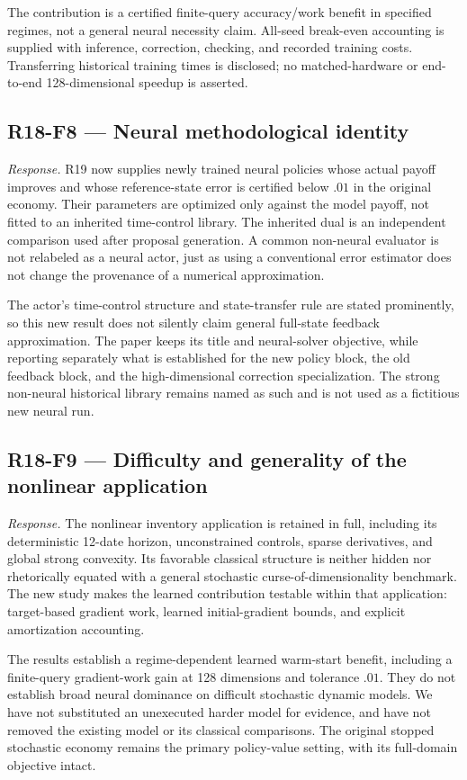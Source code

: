The contribution is a certified finite-query accuracy/work benefit in specified regimes, not a general neural necessity claim. All-seed break-even accounting is supplied with inference, correction, checking, and recorded training costs. Transferring historical training times is disclosed; no matched-hardware or end-to-end 128-dimensional speedup is asserted.

\subsection{R18-F8 --- Neural methodological identity}
\emph{Response.} R19 now supplies newly trained neural policies whose actual payoff improves and whose reference-state error is certified below $.01$ in the original economy. Their parameters are optimized only against the model payoff, not fitted to an inherited time-control library. The inherited dual is an independent comparison used after proposal generation. A common non-neural evaluator is not relabeled as a neural actor, just as using a conventional error estimator does not change the provenance of a numerical approximation.

The actor's time-control structure and state-transfer rule are stated prominently, so this new result does not silently claim general full-state feedback approximation. The paper keeps its title and neural-solver objective, while reporting separately what is established for the new policy block, the old feedback block, and the high-dimensional correction specialization. The strong non-neural historical library remains named as such and is not used as a fictitious new neural run.

\subsection{R18-F9 --- Difficulty and generality of the nonlinear application}
\emph{Response.} The nonlinear inventory application is retained in full, including its deterministic 12-date horizon, unconstrained controls, sparse derivatives, and global strong convexity. Its favorable classical structure is neither hidden nor rhetorically equated with a general stochastic curse-of-dimensionality benchmark. The new study makes the learned contribution testable within that application: target-based gradient work, learned initial-gradient bounds, and explicit amortization accounting.

The results establish a regime-dependent learned warm-start benefit, including a finite-query gradient-work gain at 128 dimensions and tolerance $.01$. They do not establish broad neural dominance on difficult stochastic dynamic models. We have not substituted an unexecuted harder model for evidence, and have not removed the existing model or its classical comparisons. The original stopped stochastic economy remains the primary policy-value setting, with its full-domain objective intact.

